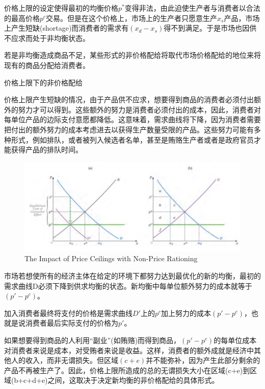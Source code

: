 \documentclass{article}
\begin{document}
价格上限的设定使得最初的均衡价格$ p^* $变得非法，由此迫使生产者与消费者以合法的最高价格$ p^c $交易。但是在这个价格上，市场上的生产者只愿意生产$ x_s $产品，市场上产生短缺(shortage)而消费者的需求有$ (x_d-x_s) $得不到满足。于是市场也因供不应求而处于非均衡状态。

若是非均衡造成商品不足，某些形式的非价格配给将取代市场价格配给的地位来将现有的商品分配给消费者。

\hspace*{\fill}

价格上限下的非价格配给

价格上限产生短缺的情况，由于产品供不应求，想要得到商品的消费者必须付出额外的努力才可以得到。这些额外的努力是消费者必须付出的成本，因此，消费者对每单位产品的边际支付意愿都降低。这意味着，需求曲线将下降，因为消费者需要把付出的额外努力的成本考虑进去以获得生产数量受限的产品。这些努力可能有多种形式，例如排队，或者被列入候选者名单，甚至是贿赂生产者或者是政府官员才能获得产品的排队时间。

\begin{figure}[H] %
	\centering %
	\includegraphics[width=1\textwidth]{18_8} %
	\caption{The Impact of Price Ceilings with Non-Price Rationing} %
	\label{Fig.main9} %
\end{figure}

市场若想使所有的经济主体在给定的环境下都努力达到最优化的新的均衡，最初的需求曲线D必须下降到供求均衡的状态。新均衡中每单位额外努力的成本就等于$ (p'-p^c) $。

加入消费者最终将支付的价格是需求曲线$ D' $上的$ p^c $加上努力的成本$ (p'-p^c) $，也就是说消费者最后实际支付的价格为$ p' $。

如果想要得到商品的人利用“副业”(如贿赂)而得到商品，$ (p'-p^c) $的每单位成本对消费者来说是成本，对受贿者来说是收益。这样，消费者的额外成就是经济中其他人的收入，而非无谓损失。但区域$ (c+e) $并不能弥补，因为产生此部分剩余的产品不再被生产了。因此，价格上限所造成的总的无谓损失大小在区域(c+e)到区域(b+c+d+e)之间，这取决于决定新均衡的非价格配给的具体形式。
\end{document}

